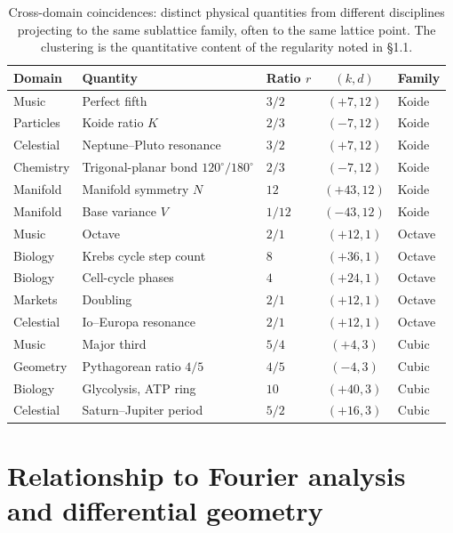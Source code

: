\documentclass[11pt,a4paper]{article}
\theoremstyle{definition}
\theoremstyle{remark}
\begin{document}
\begin{table}[h]
\centering
\small
\begin{tabular}{@{}l l l c l@{}}
\toprule
Domain & Quantity & Ratio $r$ & $(k,d)$ & Family\\
\midrule
Music & Perfect fifth & $3/2$ & $(+7, 12)$ & Koide\\
Particles & Koide ratio $K$ & $2/3$ & $(-7, 12)$ & Koide\\
Celestial & Neptune--Pluto resonance & $3/2$ & $(+7, 12)$ & Koide\\
Chemistry & Trigonal-planar bond $120^{\circ}/180^{\circ}$ & $2/3$ & $(-7, 12)$ & Koide\\
Manifold & Manifold symmetry $N$ & $12$ & $(+43, 12)$ & Koide\\
Manifold & Base variance $V$ & $1/12$ & $(-43, 12)$ & Koide\\
\addlinespace
Music & Octave & $2/1$ & $(+12, 1)$ & Octave\\
Biology & Krebs cycle step count & $8$ & $(+36, 1)$ & Octave\\
Biology & Cell-cycle phases & $4$ & $(+24, 1)$ & Octave\\
Markets & Doubling & $2/1$ & $(+12, 1)$ & Octave\\
Celestial & Io--Europa resonance & $2/1$ & $(+12, 1)$ & Octave\\
\addlinespace
Music & Major third & $5/4$ & $(+4, 3)$ & Cubic\\
Geometry & Pythagorean ratio $4/5$ & $4/5$ & $(-4, 3)$ & Cubic\\
Biology & Glycolysis, ATP ring & $10$ & $(+40, 3)$ & Cubic\\
Celestial & Saturn--Jupiter period & $5/2$ & $(+16, 3)$ & Cubic\\
\bottomrule
\end{tabular}
\caption{Cross-domain coincidences: distinct physical quantities from different disciplines projecting to the same sublattice family, often to the same lattice point. The clustering is the quantitative content of the regularity noted in \S1.1.}
\label{tab:cross}
\end{table}

\section{Relationship to Fourier analysis and differential geometry}\label{sec:comparison}
\end{document}
